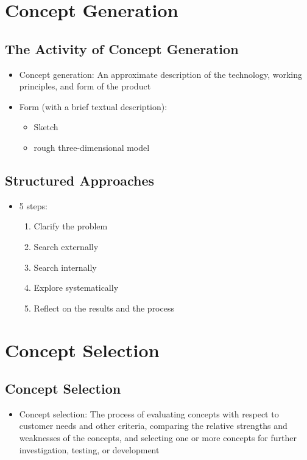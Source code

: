 \documentclass[a4paper,12pt,openany]{book}
\begin{document}
\chapter{Concept Generation}
\section{The Activity of Concept Generation}
\begin{itemize}
    \item Concept generation: An approximate description of the technology, working principles, and form of the product
    \item Form (with a brief textual description):
    \begin{itemize}
        \item Sketch
        \item rough three-dimensional model
    \end{itemize}
\end{itemize}
\section{Structured Approaches}
\begin{itemize}
    \item 5 steps:
    \begin{enumerate}
        \item Clarify the problem
        \item Search externally
        \item Search internally
        \item Explore systematically
        \item Reflect on the results and the process
    \end{enumerate}
\end{itemize}

\chapter{Concept Selection}
\section{Concept Selection}
\begin{itemize}
    \item Concept selection: The process of evaluating concepts with respect to customer needs and other criteria, comparing the relative strengths and weaknesses of the concepts, and selecting one or more concepts for further investigation, testing, or development
\end{itemize}
\end{document}
